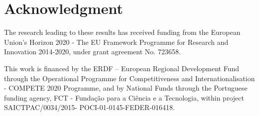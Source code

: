 \section*{Acknowledgment}\label{sec:acknowledgments}

The research leading to these results has received funding from the European Union’s Horizon 2020 - The EU Framework Programme for Research and Innovation 2014-2020, under grant agreement No. 723658.

This work is financed by the ERDF – European Regional Development Fund through the Operational Programme for Competitiveness and Internationalisation - COMPETE 2020 Programme, and by National Funds through the Portuguese funding agency, FCT - Fundação para a Ciência e a Tecnologia, within project SAICTPAC/0034/2015- POCI-01-0145-FEDER-016418.
